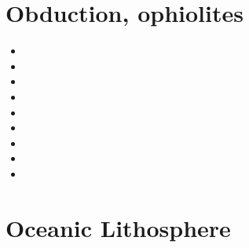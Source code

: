 \newpage
\section{Obduction, ophiolites}

\begin{small}
\begin{itemize}
\item[\nineteenninety] 
\item[\nineteenninetyone] 
\item[\nineteenninetyseven] 
\item[\twothousand] 
\item[\twothousandfourteen] 
\item[\twothousandsixteen] 
\item[\twothousandtwenty] 
\item[\twothousandtwentyone] 
\item[\twothousandtwentytwo] 
\end{itemize}
\end{small}

\section{Oceanic Lithosphere}

